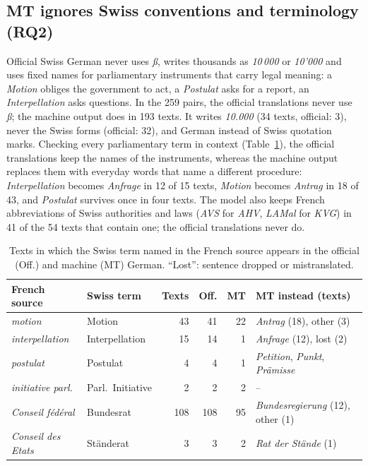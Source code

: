 \documentclass[11pt,a4paper]{article}
\begin{document}
\subsection{MT ignores Swiss conventions and terminology (RQ2)}

Official Swiss German never uses \emph{\ss}, writes thousands as
\emph{10\,000} or \emph{10'000} and uses fixed names for parliamentary
instruments that carry legal meaning: a \emph{Motion} obliges the government to
act, a \emph{Postulat} asks for a report, an \emph{Interpellation} asks
questions. In the 259 pairs, the official translations never use \emph{\ss}; the
machine output does in 193 texts. It writes \emph{10.000} (34 texts, official:
3), never the Swiss forms (official: 32), and German instead of Swiss quotation
marks. Checking every parliamentary term in context (Table~\ref{tab:terms}), the
official translations keep the names of the instruments, whereas the machine
output replaces them with everyday words that name a different procedure: \emph{Interpellation} becomes \emph{Anfrage} in 12 of 15
texts, \emph{Motion} becomes \emph{Antrag} in 18 of 43, and \emph{Postulat}
survives once in four texts. The model also keeps French abbreviations of Swiss
authorities and laws (\emph{AVS} for \emph{AHV}, \emph{LAMal} for \emph{KVG})
in 41 of the 54 texts that contain one; the official translations never do.

\begin{table}[H]
\centering
\small
\setlength{\tabcolsep}{4pt}
\begin{tabular}{llrrrl}
\toprule
French source & Swiss term & Texts & Off. & MT & MT instead (texts) \\
\midrule
\emph{motion} & Motion & 43 & 41 & 22 & \emph{Antrag} (18), other (3) \\
\emph{interpellation} & Interpellation & 15 & 14 & 1 & \emph{Anfrage} (12), lost (2) \\
\emph{postulat} & Postulat & 4 & 4 & 1 & \emph{Petition}, \emph{Punkt}, \emph{Pr\"amisse} \\
\emph{initiative parl.} & Parl.\ Initiative & 2 & 2 & 2 & -- \\
\emph{Conseil f\'ed\'eral} & Bundesrat & 108 & 108 & 95 & \emph{Bundesregierung} (12), other (1) \\
\emph{Conseil des Etats} & St\"anderat & 3 & 3 & 2 & \emph{Rat der St\"ande} (1) \\
\bottomrule
\end{tabular}
\caption{Texts in which the Swiss term named in the French source appears in the
official (Off.) and machine (MT) German. ``Lost'': sentence dropped or mistranslated.}
\label{tab:terms}
\end{table}
\end{document}
